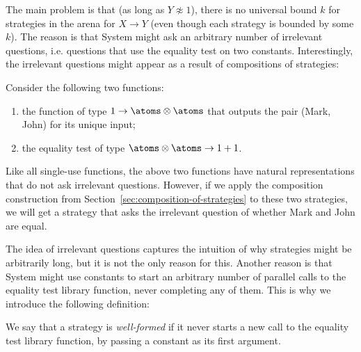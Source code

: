 The main problem is that (as long as $Y \not \approx 1$), there is no universal bound $k$ for strategies in the arena for $X \to Y$
(even though each strategy is bounded by some $k$). The  reason is that System might ask an arbitrary number of irrelevant questions, 
i.e. questions that use the equality test on two constants. Interestingly, the irrelevant questions might appear as a result of compositions of strategies:
\begin{example}\label{ex:irrelevant-questions-from-composition}
    Consider the  following two functions: 
    \begin{enumerate}
        \item the function of type  $1 \to \atoms \otimes \atoms$ that outputs the pair (Mark, John) for its unique input;
        \item the equality test of type $\atoms \otimes \atoms \to 1 + 1$.
    \end{enumerate}
    Like all single-use functions, the above two functions have natural representations that do not ask irrelevant questions.
    However, if we apply the composition construction from Section~\ref{sec:composition-of-strategies} to these two strategies, we will get a strategy that asks the irrelevant question of whether Mark and John are equal. \exampleend
\end{example}

The idea of irrelevant questions captures the intuition of why strategies might be arbitrarily long, but it is not the only reason for this. Another reason is that System might use constants to start an arbitrary number of parallel calls to the equality test library function, 
never completing any of them. This is why we introduce the following definition:
\begin{definition}
    We say that a strategy is \emph{well-formed} if it never starts a new call to the equality test library function, by passing a constant as its first argument.
\end{definition}

